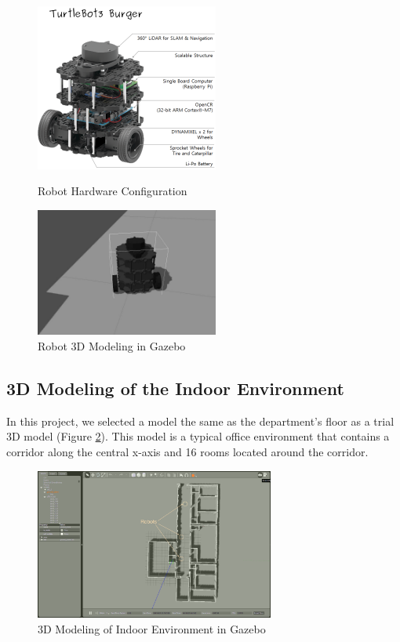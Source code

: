 \begin{figure}[htbp]
\centering
\begin{minipage}[t]{0.48\textwidth}
\centering
\includegraphics[width=6cm]{content/images/ch2/turtlebot3_burger_components.png}
\caption{Robot Hardware Configuration \cite{Pyo17}}
\label{fig:robot_hardware}
\end{minipage}
\begin{minipage}[t]{0.48\textwidth}
\centering
\includegraphics[width=6cm]{content/images/ch2/robot_model.jpg}
\caption{Robot 3D Modeling in Gazebo}
\label{fig:simulated_robot}
\end{minipage}
\end{figure}

\subsection{3D Modeling of the Indoor Environment}

In this project, we selected a model the same as the department's floor as a trial 3D model (Figure \ref{fig:modeling_environment_gazebo}).
This model is a typical office environment that contains a corridor along the central x-axis and 16 rooms located around the corridor. 

\begin{figure}[htbp]
 \centering
 \includegraphics[width = 0.7\textwidth]{content/images/ch2/gazebo_gui_environment.png}
 \caption{3D Modeling of Indoor Environment in Gazebo}
 \label{fig:modeling_environment_gazebo}
\end{figure}

